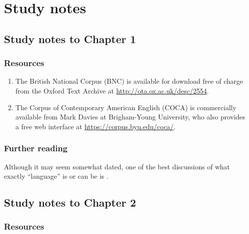 \chapter{Study notes}
\label{ch:studynotes}

\section*{Study notes to Chapter 1}
\label{sec:studynotes01}

\subsection*{Resources}

\begin{enumerate}
  \item The British National Corpus (BNC) is available for download free of charge from the Oxford Text Archive at \url{http://ota.ox.ac.uk/desc/2554}.
  \item The Corpus of Contemporary American English (COCA) is commercially available from Mark Davies at Brigham-Young University, who also provides a free web interface at \url{https://corpus.byu.edu/coca/}.
\end{enumerate}

\subsection*{Further reading}

Although it may seem somewhat dated, one of the best discussions of what exactly ``language'' is or can be is \citet{lyons_language_1981}.

\section*{Study notes to Chapter 2}
\label{sec:studynotes02}

\subsection*{Resources}

